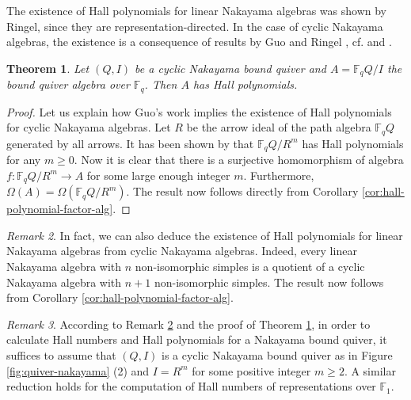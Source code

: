 \documentclass[12pt]{amsart}
\newtheorem{theorem}{Theorem}[section]
\theoremstyle{remark}
\newtheorem{remark}[theorem]{Remark}
\theoremstyle{definition}
\numberwithin{equation}{section}
\begin{document}
The existence of Hall polynomials for linear Nakayama algebras was shown by Ringel, since they are representation-directed. In the case of cyclic Nakayama algebras, the existence is a consequence of results by Guo \cite{G95} and Ringel \cite{Ringel93}, cf. \cite[Theorem 2.7]{G95} and \cite[Remark]{G95}.
\begin{theorem}\label{thm:exist-hall-nakayama}
    Let $(Q,I)$ be a cyclic Nakayama bound quiver and $A=\mathbb{F}_qQ/I$ the bound quiver algebra over $\mathbb{F}_q$. Then $A$ has Hall polynomials. 
\end{theorem}
\begin{proof}
Let us explain how Guo's work \cite{G95} implies the existence of Hall polynomials for cyclic Nakayama algebras. 
    Let $R$ be the arrow ideal of the path algebra $\mathbb{F}_qQ$ generated by all arrows. It has been shown by \cite[Theorem 2.7]{G95} that $\mathbb{F}_qQ/R^m$ has Hall polynomials for any $m\geq 0$. Now it is clear that there is a surjective homomorphism of algebra $f:\mathbb{F}_qQ/R^m\to A$ for some large enough integer $m$. Furthermore, $\Omega(A)=\Omega(\mathbb{F}_qQ/R^m)$. The result now follows directly from Corollary \ref{cor:hall-polynomial-factor-alg}.
\end{proof}

\begin{remark}\label{rem:cyclic-to-linear}
    In fact, we can also deduce the existence of Hall polynomials for linear Nakayama algebras from cyclic Nakayama algebras. Indeed, every linear Nakayama algebra with $n$ non-isomorphic simples is a quotient of a cyclic Nakayama algebra with $n+1$ non-isomorphic simples. The result now follows from Corollary \ref{cor:hall-polynomial-factor-alg}.
\end{remark}
\begin{remark}\label{rem:general-to-homogenous-m}
According to Remark \ref{rem:cyclic-to-linear} and the proof of Theorem \ref{thm:exist-hall-nakayama}, in order to calculate Hall numbers and Hall polynomials for a Nakayama bound quiver, it suffices to assume that $(Q,I)$ is a cyclic Nakayama bound quiver as in Figure \ref{fig:quiver-nakayama} (2) and $I=R^m$ for some positive integer $m\geq 2$. A similar reduction holds for the computation of Hall numbers of representations over $\mathbb{F}_1$.
\end{remark}
\end{document}
